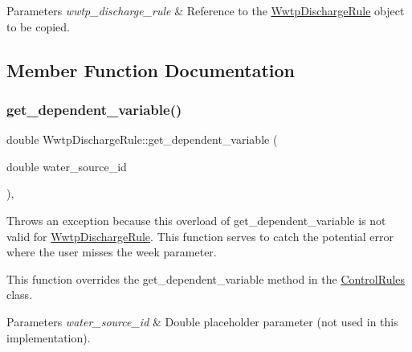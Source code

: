 \begin{DoxyParams}{Parameters}
{\em wwtp\+\_\+discharge\+\_\+rule} & Reference to the {\ttfamily \mbox{\hyperlink{classWwtpDischargeRule}{Wwtp\+Discharge\+Rule}}} object to be copied. \\
\hline
\end{DoxyParams}


\subsection{Member Function Documentation}
\mbox{\label{classWwtpDischargeRule_a4cea07bf746d200c9ca3018405a77a46}} 
\subsubsection{\texorpdfstring{get\+\_\+dependent\+\_\+variable()}{get\_dependent\_variable()}\hspace{0.1cm}{\footnotesize\ttfamily [1/4]}}
{\footnotesize\ttfamily double Wwtp\+Discharge\+Rule\+::get\+\_\+dependent\+\_\+variable (\begin{DoxyParamCaption}\item[{double}]{water\+\_\+source\+\_\+id }\end{DoxyParamCaption})\hspace{0.3cm}{\ttfamily [override]}, {\ttfamily [virtual]}}



Throws an exception because this overload of {\ttfamily get\+\_\+dependent\+\_\+variable} is not valid for {\ttfamily \mbox{\hyperlink{classWwtpDischargeRule}{Wwtp\+Discharge\+Rule}}}. This function serves to catch the potential error where the user misses the {\ttfamily week} parameter. 

This function overrides the {\ttfamily get\+\_\+dependent\+\_\+variable} method in the {\ttfamily \mbox{\hyperlink{classControlRules}{Control\+Rules}}} class.


\begin{DoxyParams}{Parameters}
{\em water\+\_\+source\+\_\+id} & Double placeholder parameter (not used in this implementation).\\
\hline
\end{DoxyParams}

